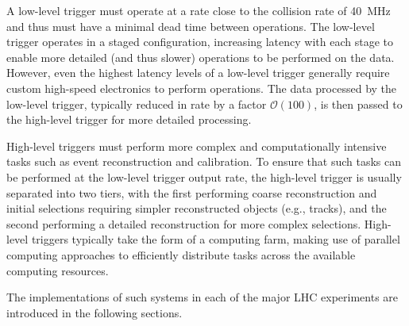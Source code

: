 A low-level trigger must operate at a rate close to the collision rate of \SI{40}{\mega\hertz} and thus must have a minimal dead time between operations. The low-level trigger operates in a staged configuration, increasing latency with each stage to enable more detailed (and thus slower) operations to be performed on the data. However, even the highest latency levels of a low-level trigger generally require custom high-speed electronics to perform operations. The data processed by the low-level trigger, typically reduced in rate by a factor $\mathcal{O}\left(100\right)$, is then passed to the high-level trigger for more detailed processing.

High-level triggers must perform more complex and computationally intensive tasks such as event reconstruction and calibration. To ensure that such tasks can be performed at the low-level trigger output rate, the high-level trigger is usually separated into two tiers, with the first performing coarse reconstruction and initial selections requiring simpler reconstructed objects (e.g., tracks), and the second performing a detailed reconstruction for more complex selections. High-level triggers typically take the form of a computing farm, making use of parallel computing approaches to efficiently distribute tasks across the available computing resources.

The implementations of such systems in each of the major LHC experiments are introduced in the following sections.





